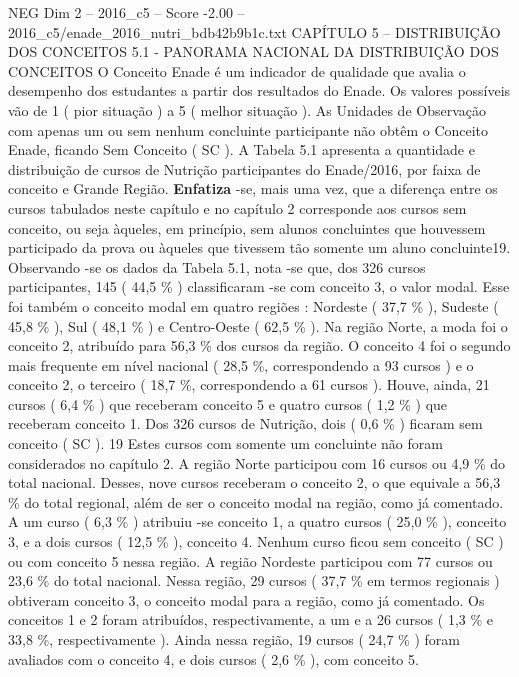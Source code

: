 \begin{textsample}{NEG Dim 2 – 2016\_c5 – Score -2.00 – 2016\_c5/enade\_2016\_nutri\_bdb42b9b1c.txt}  \label{ex:f2_neg_038}
CAPÍTULO 5 – DISTRIBUIÇÃO DOS CONCEITOS 5.1 - PANORAMA NACIONAL DA DISTRIBUIÇÃO DOS CONCEITOS O Conceito Enade é um indicador de qualidade que avalia o desempenho dos estudantes a partir dos resultados do Enade.
Os valores possíveis vão de 1 ( pior situação ) a 5 ( melhor situação ).
As Unidades de Observação com apenas um ou sem nenhum concluinte participante não obtêm o Conceito Enade, ficando Sem Conceito ( SC ).
A Tabela 5.1 apresenta a quantidade e distribuição de cursos de Nutrição participantes do Enade/2016, por faixa de conceito e Grande Região. \textbf{Enfatiza} -se, mais uma vez, que a diferença entre os cursos tabulados neste capítulo e no capítulo 2 corresponde aos cursos sem conceito, ou seja àqueles, em princípio, sem alunos concluintes que houvessem participado da prova ou àqueles que tivessem tão somente um aluno concluinte19.
Observando -se os dados da Tabela 5.1, nota -se que, dos 326 cursos participantes, 145 ( 44,5 \% ) classificaram -se com conceito 3, o valor modal.
Esse foi também o conceito modal em quatro regiões : Nordeste ( 37,7 \% ), Sudeste ( 45,8 \% ), Sul ( 48,1 \% ) e Centro-Oeste ( 62,5 \% ).
Na região Norte, a moda foi o conceito 2, atribuído para 56,3 \% dos cursos da região.
O conceito 4 foi o segundo mais frequente em nível nacional ( 28,5 \%, correspondendo a 93 cursos ) e o conceito 2, o terceiro ( 18,7 \%, correspondendo a 61 cursos ).
Houve, ainda, 21 cursos ( 6,4 \% ) que receberam conceito 5 e quatro cursos ( 1,2 \% ) que receberam conceito 1.
Dos 326 cursos de Nutrição, dois ( 0,6 \% ) ficaram sem conceito ( SC ). 19 Estes cursos com somente um concluinte não foram considerados no capítulo 2.
A região Norte participou com 16 cursos ou 4,9 \% do total nacional.
Desses, nove cursos receberam o conceito 2, o que equivale a 56,3 \% do total regional, além de ser o conceito modal na região, como já comentado.
A um curso ( 6,3 \% ) atribuiu -se conceito 1, a quatro cursos ( 25,0 \% ), conceito 3, e a dois cursos ( 12,5 \% ), conceito 4.
Nenhum curso ficou sem conceito ( SC ) ou com conceito 5 nessa região.
A região Nordeste participou com 77 cursos ou 23,6 \% do total nacional.
Nessa região, 29 cursos ( 37,7 \% em termos regionais ) obtiveram conceito 3, o conceito modal para a região, como já comentado.
Os conceitos 1 e 2 foram atribuídos, respectivamente, a um e a 26 cursos ( 1,3 \% e 33,8 \%, respectivamente ).
Ainda nessa região, 19 cursos ( 24,7 \% ) foram avaliados com o conceito 4, e dois cursos ( 2,6 \% ), com conceito 5.

\end{textsample}
